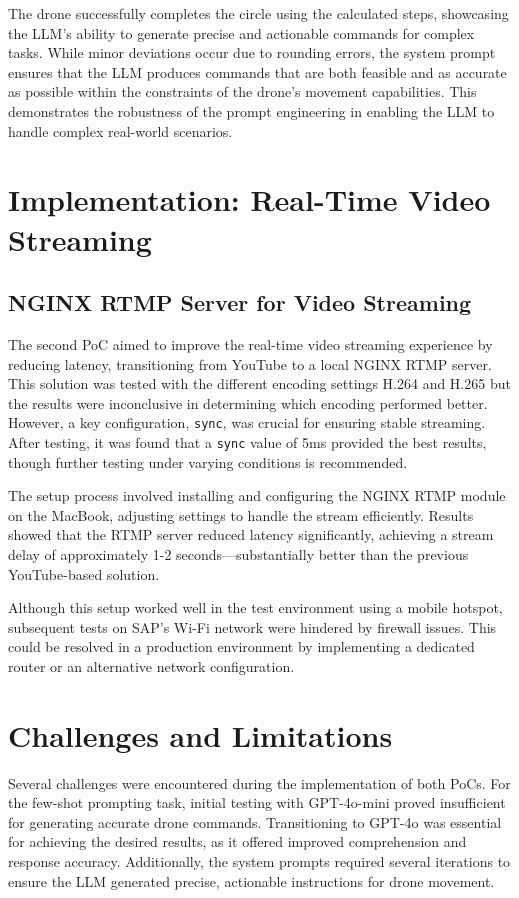 The drone successfully completes the circle using the calculated steps, showcasing the \ac{LLM}'s ability to generate precise and actionable commands for complex tasks. 
While minor deviations occur due to rounding errors, the system prompt ensures that the \ac{LLM} produces commands that are both feasible and as accurate as possible within the constraints of the drone's movement capabilities. 
This demonstrates the robustness of the prompt engineering in enabling the \ac{LLM} to handle complex real-world scenarios.

\section{Implementation: Real-Time Video Streaming}
\subsection{NGINX RTMP Server for Video Streaming}
The second \ac{PoC} aimed to improve the real-time video streaming experience by reducing latency, transitioning from YouTube to a local NGINX \ac{RTMP} server. 
This solution was tested with the different encoding settings H.264 and H.265 but the results were inconclusive in determining which encoding performed better. 
However, a key configuration, \texttt{sync}, was crucial for ensuring stable streaming. After testing, it was found that a \texttt{sync} value of 5ms provided the best results, 
though further testing under varying conditions is recommended.

The setup process involved installing and configuring the NGINX \ac{RTMP} module on the MacBook, adjusting settings to handle the stream efficiently. 
Results showed that the \ac{RTMP} server reduced latency significantly, achieving a stream delay of approximately 1-2 seconds—substantially better than the previous YouTube-based solution.

Although this setup worked well in the test environment using a mobile hotspot, subsequent tests on SAP's Wi-Fi network were hindered by firewall issues. 
This could be resolved in a production environment by implementing a dedicated router or an alternative network configuration.

\section{Challenges and Limitations}
Several challenges were encountered during the implementation of both \acp{PoC}. For the few-shot prompting task, initial testing with GPT-4o-mini proved insufficient for generating accurate drone commands. 
Transitioning to GPT-4o was essential for achieving the desired results, as it offered improved comprehension and response accuracy. 
Additionally, the system prompts required several iterations to ensure the \ac{LLM} generated precise, actionable instructions for drone movement.

